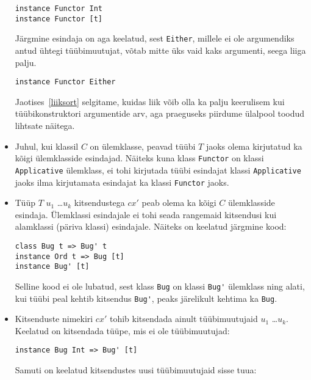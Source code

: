 \documentclass[12pt]{article}
\begin{document}
\begin{itemize}
            \begin{verbatim}instance Functor Int
instance Functor [t]\end{verbatim}

            Järgmine esindaja on aga keelatud, sest \verb!Either!, millele ei ole argumendiks antud ühtegi tüübimuutujat, võtab mitte üks vaid kaks argumenti, seega liiga palju.

            \begin{verbatim}instance Functor Either\end{verbatim}

            Jaotises~\ref{liiksort} selgitame, kuidas liik võib olla ka palju keerulisem kui tüübikonstruktori argumentide arv, aga praeguseks piirdume ülalpool toodud lihtsate näitega.
          \item
            Juhul, kui klassil $C$ on ülemklasse, peavad tüübi $T$ jaoks olema kirjutatud ka kõigi ülemklasside esindajad. Näiteks kuna klass \verb!Functor! on klassi \verb!Applicative! ülemklass, ei tohi kirjutada tüübi esindajat klassi \verb!Applicative! jaoks ilma kirjutamata esindajat ka klassi \verb!Functor! jaoks.
          \item
            Tüüp $T$ $u_1$ \ldots $u_k$ kitsendustega $cx'$ peab olema ka kõigi $C$ ülemklasside esindaja. Ülemklassi esindajale ei tohi seada rangemaid kitsendusi kui alamklassi (päriva klassi) esindajale. Näiteks on keelatud järgmine kood:

            \begin{verbatim}class Bug t => Bug' t
instance Ord t => Bug [t]
instance Bug' [t]\end{verbatim}

            Selline kood ei ole lubatud, sest klass \verb!Bug! on klassi \verb!Bug'! ülemklass ning alati, kui tüübi peal kehtib kitsendus \verb!Bug'!, peaks järelikult kehtima ka \verb!Bug!.
          \item
            Kitsenduste nimekiri $cx'$ tohib kitsendada ainult tüübimuutujaid $u_1$ \ldots $u_k$. Keelatud on kitsendada tüüpe, mis ei ole tüübimuutujad:

            \begin{verbatim}instance Bug Int => Bug' [t]\end{verbatim}

            Samuti on keelatud kitsendustes uusi tüübimuutujaid sisse tuua:


\end{itemize}
\end{document}
